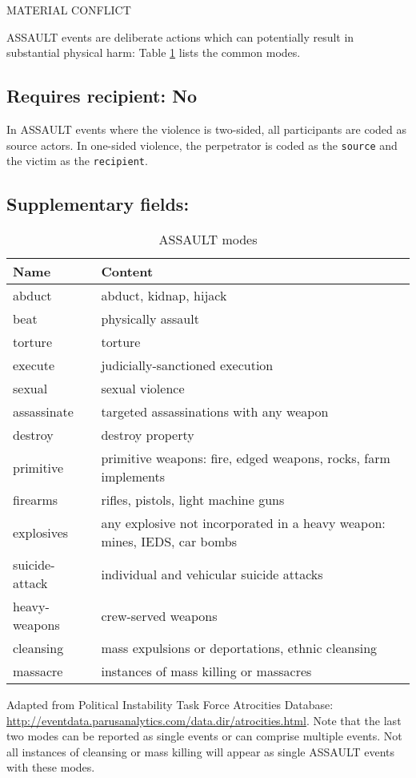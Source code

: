 \documentclass[11pt]{report}
\newcommand{\plcat}[1]{\textsf{#1}}
\begin{document}
\textsf{MATERIAL CONFLICT} \vspace{8pt}


\plcat{ASSAULT} events are deliberate actions which can potentially result in substantial physical harm: Table \ref{tab:violmode} lists the common modes.

\subsection{Requires recipient: No}

In \plcat{ASSAULT} events where the violence is two-sided, all participants are coded as source actors. In one-sided violence, the perpetrator is coded as the \texttt{source} and the victim as the \texttt{recipient}.

\subsection{Supplementary fields:}


\begin{table}[htp]
\caption{ASSAULT modes}
\begin{center}
\begin{tabular}{|l|l|}
\hline
Name & Content \\
\hline
abduct & abduct, kidnap, hijack \\
beat & physically assault \\
torture & torture \\
execute & judicially-sanctioned execution\\
sexual & sexual violence\\
assassinate & targeted assassinations with any weapon \\
destroy & destroy property \\
primitive & primitive weapons: fire, edged weapons, rocks, farm implements \\
firearms & rifles, pistols, light machine guns\\
explosives & any explosive not incorporated in a heavy weapon: mines, IEDS, car bombs \\
suicide-attack & individual and vehicular suicide attacks \\
heavy-weapons & crew-served weapons  \\
cleansing & mass expulsions or deportations, ethnic cleansing  \\
massacre & instances of mass killing or massacres  \\
\hline
\end{tabular}
\end{center}
\label{tab:violmode}
\raggedright{Adapted from Political Instability Task Force Atrocities Database: \url{http://eventdata.parusanalytics.com/data.dir/atrocities.html}. Note that the last two modes can be reported as single events or can comprise multiple events. Not all instances of cleansing or mass killing will appear as single \plcat{ASSAULT} events with these modes.}
\end{table}%
\end{document}
